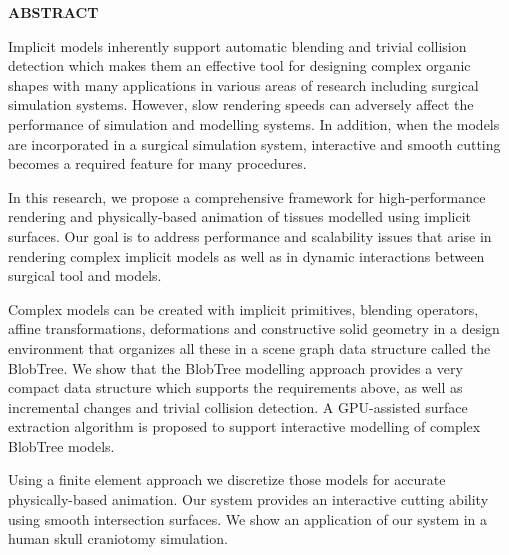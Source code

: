 \pagebreak
\newpage
{}


\begin{center}
\textbf{ABSTRACT}
\end{center}
Implicit models inherently support automatic blending and trivial collision detection 
which makes them an effective tool for designing complex organic shapes with many applications in 
various areas of research including surgical simulation systems. However, slow rendering speeds can 
adversely affect the performance of simulation and modelling systems. In addition, when the models are 
incorporated in a surgical simulation system, interactive and smooth cutting becomes a required feature 
for many procedures.

In this research, we propose a comprehensive framework for high-performance rendering
and physically-based animation of tissues modelled using implicit surfaces. Our 
goal is to address performance and scalability issues that arise in rendering 
complex implicit models as well as in dynamic interactions between surgical tool and models. 


Complex models can be created with implicit primitives, blending operators, affine
transformations, deformations and constructive solid geometry in a design environment that organizes
all these in a scene graph data structure called the BlobTree. We show that the
BlobTree modelling approach provides a very compact data structure which supports 
the requirements above, as well as incremental changes and trivial collision detection.
A GPU-assisted surface extraction algorithm is proposed to support interactive modelling of complex 
BlobTree models.

Using a finite element approach we discretize those models for accurate physically-based animation. 
Our system provides an interactive cutting ability using smooth intersection surfaces.
We show an application of our system in a human skull craniotomy simulation.


\pagebreak


